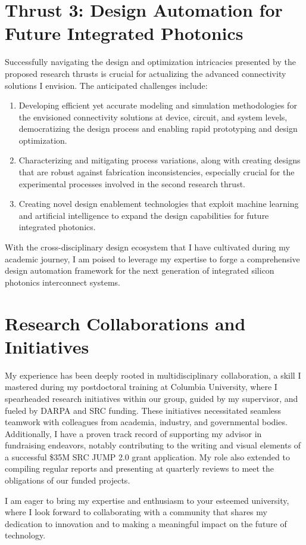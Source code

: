 \section{Thrust 3: Design Automation for Future Integrated Photonics}
Successfully navigating the design and optimization intricacies presented by the proposed research thrusts is crucial for actualizing the advanced connectivity solutions I envision. The anticipated challenges include:
\begin{enumerate}[nosep]
    \item Developing efficient yet accurate modeling and simulation methodologies for the envisioned connectivity solutions at device, circuit, and system levels, democratizing the design process and enabling rapid prototyping and design optimization.
    \item Characterizing and mitigating process variations, along with creating designs that are robust against fabrication inconsistencies, especially crucial for the experimental processes involved in the second research thrust.
    \item Creating novel design enablement technologies that exploit machine learning and artificial intelligence to expand the design capabilities for future integrated photonics.
\end{enumerate}
With the cross-disciplinary design ecosystem that I have cultivated during my academic journey\cite{wangDispersionEngineeredFabricationRobustSOI2023}\cite{wangCharacterizationApplicationsSpatial2020}\cite{wangEnergyEfficiencyYield2021}, I am poised to leverage my expertise to forge a comprehensive design automation framework for the next generation of integrated silicon photonics interconnect systems.


\section{Research Collaborations and Initiatives}
My experience has been deeply rooted in multidisciplinary collaboration, a skill I mastered during my postdoctoral training at Columbia University, where I spearheaded research initiatives within our group, guided by my supervisor, and fueled by DARPA and SRC funding. These initiatives necessitated seamless teamwork with colleagues from academia, industry, and governmental bodies. Additionally, I have a proven track record of supporting my advisor in fundraising endeavors, notably contributing to the writing and visual elements of a successful \$35M SRC JUMP 2.0 grant application. My role also extended to compiling regular reports and presenting at quarterly reviews to meet the obligations of our funded projects.

I am eager to bring my expertise and enthusiasm to your esteemed university, where I look forward to collaborating with a community that shares my dedication to innovation and to making a meaningful impact on the future of technology.

